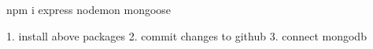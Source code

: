 npm i express nodemon mongoose

1. install above packages
2. commit changes to github
3. connect mongodb